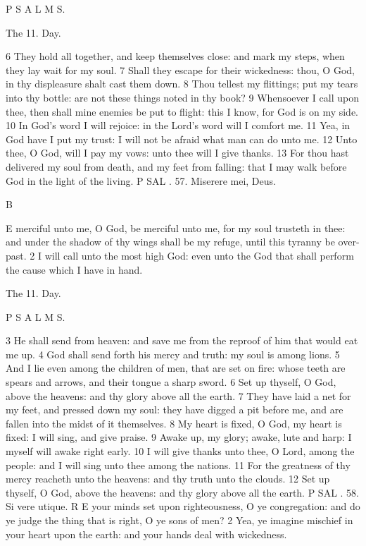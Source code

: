 P S A L M S.

The 11. Day.

6 They hold all together, and keep themselves close: and mark my steps, when they lay wait for my soul. 7 Shall they escape for their wickedness: thou, O God, in thy displeasure shalt cast them down. 8 Thou tellest my flittings; put my tears into thy bottle: are not these things noted in thy book? 9 Whensoever I call upon thee, then shall mine enemies be put to flight: this I know, for God is on my side. 10 In God’s word I will rejoice: in the Lord’s word will I comfort me. 11 Yea, in God have I put my trust: I will not be afraid what man can do unto me. 12 Unto thee, O God, will I pay my vows: unto thee will I give thanks. 13 For thou hast delivered my soul from death, and my feet from falling: that I may walk before God in the light of the living. P SAL . 57. Miserere mei, Deus.

B

E merciful unto me, O God, be merciful unto me, for my soul trusteth in thee: and under the shadow of thy wings shall be my refuge, until this tyranny be over-past. 2 I will call unto the most high God: even unto the God that shall perform the cause which I have in hand.

The 11. Day.

P S A L M S.

3 He shall send from heaven: and save me from the reproof of him that would eat me up. 4 God shall send forth his mercy and truth: my soul is among lions. 5 And I lie even among the children of men, that are set on fire: whose teeth are spears and arrows, and their tongue a sharp sword. 6 Set up thyself, O God, above the heavens: and thy glory above all the earth. 7 They have laid a net for my feet, and pressed down my soul: they have digged a pit before me, and are fallen into the midst of it themselves. 8 My heart is fixed, O God, my heart is fixed: I will sing, and give praise. 9 Awake up, my glory; awake, lute and harp: I myself will awake right early. 10 I will give thanks unto thee, O Lord, among the people: and I will sing unto thee among the nations. 11 For the greatness of thy mercy reacheth unto the heavens: and thy truth unto the clouds. 12 Set up thyself, O God, above the heavens: and thy glory above all the earth. P SAL . 58. Si vere utique. R E your minds set upon righteousness, O ye congregation: and do ye judge the thing that is right, O ye sons of men? 2 Yea, ye imagine mischief in your heart upon the earth: and your hands deal with wickedness.

